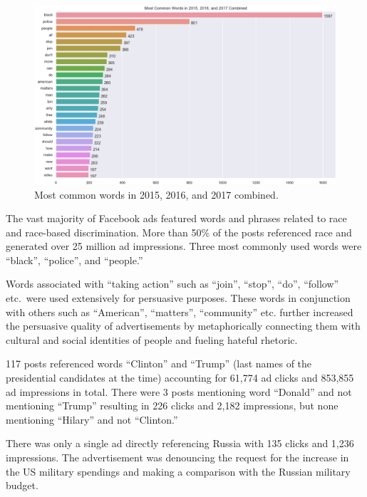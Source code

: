 \documentclass{article}
\begin{document}
\begin{figure}[H]
\centering
\includegraphics[width=\linewidth]{./image/barchart-plots/barchart_word_counts.png}
\caption{Most common words in 2015, 2016, and 2017 combined.}
\end{figure}

The vast majority of Facebook ads featured words and phrases related to race
and race-based discrimination. More than 50\% of the posts referenced race and
generated over 25 million ad impressions. Three most commonly used words were
``black'', ``police'', and ``people.''

\bigskip

Words associated with ``taking action'' such as ``join'', ``stop'', ``do'',
``follow'' etc.~were used extensively for persuasive purposes. These words in
conjunction with others such as ``American'', ``matters'', ``community'' etc.
further increased the persuasive quality of advertisements by metaphorically
connecting them with cultural and social identities of people and fueling
hateful rhetoric.

\bigskip

117 posts referenced words ``Clinton'' and ``Trump'' (last names of the
presidential candidates at the time) accounting for 61,774 ad clicks and
853,855 ad impressions in total. There were 3 posts mentioning word ``Donald''
and not mentioning ``Trump'' resulting in 226 clicks and 2,182 impressions, but
none mentioning ``Hilary'' and not ``Clinton.''

\bigskip

There was only a single ad directly referencing Russia with 135 clicks and
1,236 impressions. The advertisement was denouncing the request for the
increase in the US military spendings and making a comparison with the Russian
military budget.
\end{document}
